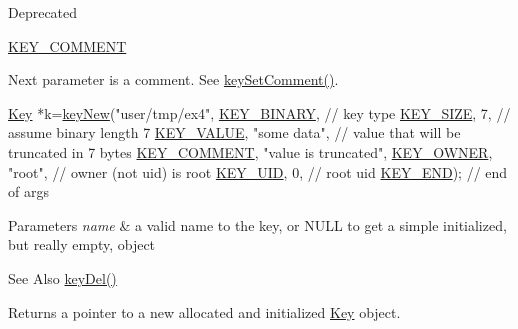 \begin{DoxyRefDesc}{Deprecated}
\begin{DoxyItemize}
\item \hyperlink{group__key_gga91fb3178848bd682000958089abbaf40ac29427bb47cc31689d02912e36161ee3}{K\-E\-Y\-\_\-\-C\-O\-M\-M\-E\-N\-T} \par
 Next parameter is a comment. See \hyperlink{group__meta_ga8863a877a84fa46e6017fe72e49b89c1}{key\-Set\-Comment()}. 
\begin{DoxyCodeInclude}
\hyperlink{classkdb_1_1Key_a5679f5cae63caddd64a60388b9cc77fa}{Key} *k=\hyperlink{group__key_gad23c65b44bf48d773759e1f9a4d43b89}{keyNew}(\textcolor{stringliteral}{"user/tmp/ex4"},
        \hyperlink{group__key_gga91fb3178848bd682000958089abbaf40a1ca18d4e094ae7487d35ecedda2235ff}{KEY\_BINARY},                   \textcolor{comment}{// key type}
        \hyperlink{group__key_gga91fb3178848bd682000958089abbaf40a6d531b5c41445d19d0452eebdccbfa01}{KEY\_SIZE}, 7,                    \textcolor{comment}{// assume binary length 7}
        \hyperlink{group__key_gga91fb3178848bd682000958089abbaf40ac66e4a49d09212b79f5754ca6db5bd2e}{KEY\_VALUE}, \textcolor{stringliteral}{"some data"},                \textcolor{comment}{// value that will be
       truncated in 7 bytes}
        \hyperlink{group__key_gga91fb3178848bd682000958089abbaf40ac29427bb47cc31689d02912e36161ee3}{KEY\_COMMENT}, \textcolor{stringliteral}{"value is truncated"},
        \hyperlink{group__key_gga91fb3178848bd682000958089abbaf40a77ca60362fa8daca8d5347db4385068b}{KEY\_OWNER}, \textcolor{stringliteral}{"root"},             \textcolor{comment}{// owner (not uid) is root}
        \hyperlink{group__key_gga91fb3178848bd682000958089abbaf40a28f01a87d65f065172f734c9c9446c0e}{KEY\_UID}, 0,                      \textcolor{comment}{// root uid}
        \hyperlink{group__key_gga91fb3178848bd682000958089abbaf40aa8adb6fcb92dec58fb19410eacfdd403}{KEY\_END});                        \textcolor{comment}{// end of args}
\end{DoxyCodeInclude}

\end{DoxyItemize}\end{DoxyRefDesc}



\begin{DoxyParams}{Parameters}
{\em name} & a valid name to the key, or N\-U\-L\-L to get a simple initialized, but really empty, object \\
\hline
\end{DoxyParams}
\begin{DoxySeeAlso}{See Also}
\hyperlink{group__key_ga3df95bbc2494e3e6703ece5639be5bb1}{key\-Del()} 
\end{DoxySeeAlso}
\begin{DoxyReturn}{Returns}
a pointer to a new allocated and initialized \hyperlink{classkdb_1_1Key}{Key} object. 
\end{DoxyReturn}

